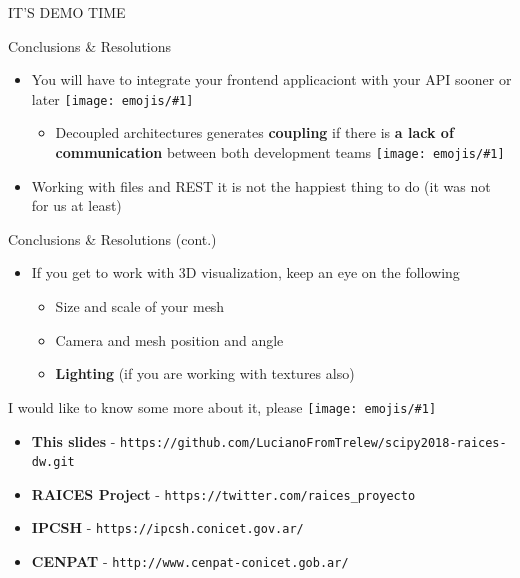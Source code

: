 \documentclass{beamer}
\newcommand{\emoji}[1]{\texttt{[image: emojis/\#1]}}
\begin{document}
\begin{frame}[fragile]
    \begin{center}
        \Huge
        IT'S DEMO TIME
    \end{center}
\end{frame}

\begin{frame}[fragile]{Conclusions \& Resolutions}
    \begin{itemize}
        \item You will have to integrate your frontend applicaciont  with your API sooner or later \emoji{man_shrugging.png}
        \begin{itemize}
            \item Decoupled architectures generates \textbf{coupling} if there is \textbf{a lack of communication} between both development teams \emoji{speak_no_evil.png}
        \end{itemize}
        \item Working with files and REST it is not the happiest thing to do (it was not for us at least)
    \end{itemize}
\end{frame}

\begin{frame}[fragile]{Conclusions \& Resolutions (cont.)}
    \begin{itemize}
        \item If you get to work with 3D visualization, keep an eye on the following
        \begin{itemize}
            \item Size and scale of your mesh
            \item Camera and mesh position and angle
            \item \textbf{Lighting} (if you are working with textures also) 
        \end{itemize}
    \end{itemize}
\end{frame}

\begin{frame}[fragile]{I would like to know some more about it, please \emoji{nerd.png}}
    \begin{itemize}
        \item \textbf{This slides} - {\scriptsize\texttt{https://github.com/LucianoFromTrelew/scipy2018-raices-dw.git}}  
        \item \textbf{RAICES Project} - \texttt{https://twitter.com/raices\_proyecto}
        \item \textbf{IPCSH} - \texttt{https://ipcsh.conicet.gov.ar/} 
        \item \textbf{CENPAT} - \texttt{http://www.cenpat-conicet.gob.ar/} 
    \end{itemize}
\end{frame}
\end{document}
